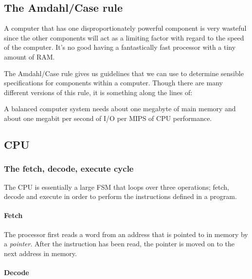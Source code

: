 \subsection{The Amdahl/Case rule}

A computer that has one disproportionately powerful component is very wasteful
since the other components will act as a limiting factor with regard to the
speed of the computer. It's no good having a fantastically fast processor with a
tiny amount of RAM.

The Amdahl/Case rule gives us guidelines that we can use to determine sensible
specifications for components within a computer. Though there are many different
versions of this rule, it is something along the lines of:


\begin{fancyquote}
		A balanced computer system needs about one megabyte of main memory and
		about one megabit per second of I/O per MIPS of CPU performance.
\end{fancyquote}

\subsection{CPU}

\subsubsection{The fetch, decode, execute cycle}

The CPU is essentially a large FSM that
loops over three operations; fetch, decode and execute in order to perform the
instructions defined in a program.

\paragraph{Fetch}\mbox{}

The processor first reads a word from an address
that is pointed to in memory by a {\it pointer}. After the instruction has been
read, the pointer is moved on to the next address in memory.

\paragraph{Decode}\mbox{}

